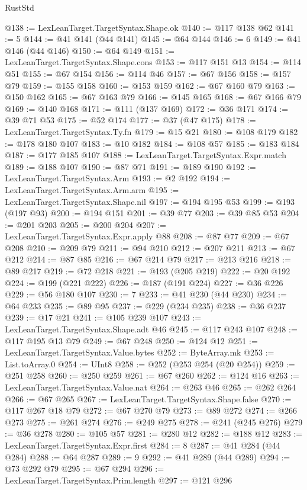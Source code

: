 \begin{lexlean}{RustStd}
\begin{coremodule}
@138 := LexLeanTarget.TargetSyntax.Shape.ok
@140 := @117 @138 @62
@141 := 5
@144 := @41 @141 (@44 @141)
@145 := @64 @144
@146 := 6
@149 := @41 @146 (@44 @146)
@150 := @64 @149
@151 := LexLeanTarget.TargetSyntax.Shape.cons
@153 := @117 @151 @13
@154 := @114 @51
@155 := @67 @154
@156 := @114 @46
@157 := @67 @156
@158 := @157 @79
@159 := @155 @158
@160 := @153 @159
@162 := @67 @160 @79
@163 := @150 @162
@165 := @67 @163 @79
@166 := @145 @165
@168 := @67 @166 @79
@169 := @140 @168
@171 := @111 (@137 @169)
@172 := @36 @171
@174 := @39 @71 @53
@175 := @52 @174
@177 := @37 (@47 @175)
@178 := LexLeanTarget.TargetSyntax.Ty.fn
@179 := @15 @21
@180 := @108 @179
@182 := @178 @180 @107
@183 := @10 @182
@184 := @108 @57
@185 := @183 @184
@187 := @177 @185 @107
@188 := LexLeanTarget.TargetSyntax.Expr.match
@189 := @188 @107
@190 := @87 @71
@191 := @189 @190
@192 := LexLeanTarget.TargetSyntax.Arm
@193 := @2 @192
@194 := LexLeanTarget.TargetSyntax.Arm.arm
@195 := LexLeanTarget.TargetSyntax.Shape.nil
@197 := @194 @195 @53
@199 := @193 (@197 @93)
@200 := @194 @151
@201 := @39 @77
@203 := @39 @85 @53
@204 := @201 @203
@205 := @200 @204
@207 := LexLeanTarget.TargetSyntax.Expr.apply @88
@208 := @87 @77
@209 := @67 @208
@210 := @209 @79
@211 := @94 @210
@212 := @207 @211
@213 := @67 @212
@214 := @87 @85
@216 := @67 @214 @79
@217 := @213 @216
@218 := @89 @217
@219 := @72 @218
@221 := @193 (@205 @219)
@222 := @20 @192
@224 := @199 (@221 @222)
@226 := @187 (@191 @224)
@227 := @36 @226
@229 := @56 @180 @107
@230 := 7
@233 := @41 @230 (@44 @230)
@234 := @64 @233
@235 := @89 @95
@237 := @229 (@234 @235)
@238 := @36 @237
@239 := @17 @21
@241 := @105 @239 @107
@243 := LexLeanTarget.TargetSyntax.Shape.adt @46
@245 := @117 @243 @107
@248 := @117 @195 @13 @79
@249 := @67 @248
@250 := @124 @12
@251 := LexLeanTarget.TargetSyntax.Value.bytes
@252 := ByteArray.mk
@253 := List.toArray.{0}
@254 := UInt8
@258 := @252 (@253 @254 (@20 @254))
@259 := @251 @258
@260 := @250 @259
@261 := @67 @260
@262 := @124 @16
@263 := LexLeanTarget.TargetSyntax.Value.nat
@264 := @263 @46
@265 := @262 @264
@266 := @67 @265
@267 := LexLeanTarget.TargetSyntax.Shape.false
@270 := @117 @267 @18 @79
@272 := @67 @270 @79
@273 := @89 @272
@274 := @266 @273
@275 := @261 @274
@276 := @249 @275
@278 := @241 (@245 @276)
@279 := @36 @278
@280 := @105 @57
@281 := @280 @12
@282 := @188 @12
@283 := LexLeanTarget.TargetSyntax.Expr.first
@284 := 8
@287 := @41 @284 (@44 @284)
@288 := @64 @287
@289 := 9
@292 := @41 @289 (@44 @289)
@294 := @73 @292 @79
@295 := @67 @294
@296 := LexLeanTarget.TargetSyntax.Prim.length
@297 := @121 @296

\end{coremodule}
\end{lexlean}
